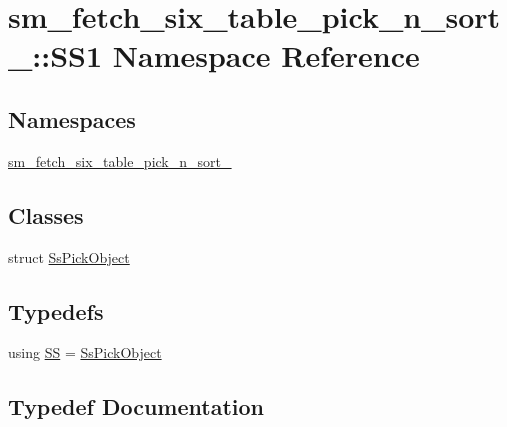 \hypertarget{namespacesm__fetch__six__table__pick__n__sort__1_1_1SS1}{}\section{sm\+\_\+fetch\+\_\+six\+\_\+table\+\_\+pick\+\_\+n\+\_\+sort\+\_\+:\+:S\+S1 Namespace Reference}
\label{namespacesm__fetch__six__table__pick__n__sort__1_1_1SS1}
\subsection*{Namespaces}
\begin{DoxyCompactItemize}
\item 
 \hyperlink{namespacesm__fetch__six__table__pick__n__sort__1_1_1SS1_1_1sm__fetch__six__table__pick__n__sort__1}{sm\+\_\+fetch\+\_\+six\+\_\+table\+\_\+pick\+\_\+n\+\_\+sort\+\_}
\end{DoxyCompactItemize}
\subsection*{Classes}
\begin{DoxyCompactItemize}
\item 
struct \hyperlink{structsm__fetch__six__table__pick__n__sort__1_1_1SS1_1_1SsPickObject}{Ss\+Pick\+Object}
\end{DoxyCompactItemize}
\subsection*{Typedefs}
\begin{DoxyCompactItemize}
\item 
using \hyperlink{namespacesm__fetch__six__table__pick__n__sort__1_1_1SS1_a8d449eae610b682589fcd5ca95d19e96}{SS} = \hyperlink{structsm__fetch__six__table__pick__n__sort__1_1_1SS1_1_1SsPickObject}{Ss\+Pick\+Object}
\end{DoxyCompactItemize}


\subsection{Typedef Documentation}
\mbox{\label{namespacesm__fetch__six__table__pick__n__sort__1_1_1SS1_a8d449eae610b682589fcd5ca95d19e96}} 
